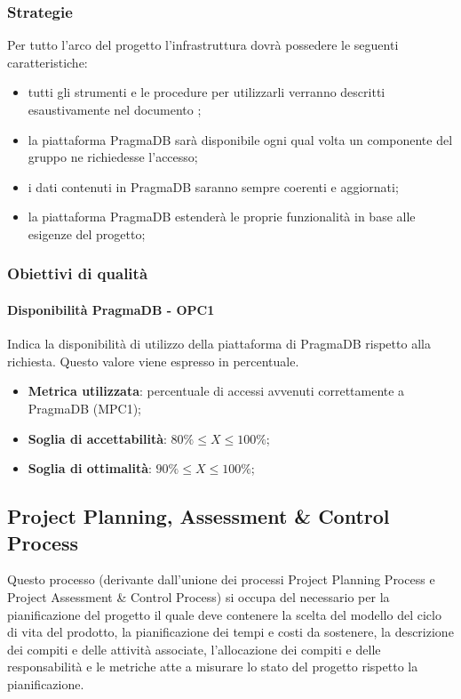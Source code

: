 \documentclass[PdQ.tex]{subfiles}
\begin{document}
		\subsubsection{Strategie}
		Per tutto l'arco del progetto l'infrastruttura dovrà possedere le seguenti caratteristiche:
		\begin{itemize}
			\item tutti gli strumenti e le procedure per utilizzarli verranno descritti esaustivamente nel documento \NPdocRP{};
			\item la piattaforma PragmaDB sarà disponibile ogni qual volta un componente del gruppo ne richiedesse l'accesso;
			\item i dati contenuti in PragmaDB saranno sempre coerenti e aggiornati;
			\item la piattaforma PragmaDB estenderà le proprie funzionalità in base alle esigenze del progetto;
		\end{itemize}
	
		\subsubsection{Obiettivi di qualità}
			\paragraph{Disponibilità PragmaDB - OPC1}
				Indica la disponibilità di utilizzo della piattaforma di PragmaDB rispetto alla richiesta. Questo valore viene espresso in percentuale.
				\begin{itemize}
					\item \textbf{Metrica utilizzata}: percentuale di accessi avvenuti correttamente a PragmaDB (MPC1);
					\item \textbf{Soglia di accettabilità}: \begin{math}80\% \leq X \leq 100\%\end{math};
					\item \textbf{Soglia di ottimalità}: \begin{math}90\% \leq X \leq 100\%\end{math};
				\end{itemize}
		
	\subsection{Project Planning, Assessment \& Control Process}
		Questo processo (derivante dall’unione dei processi Project Planning Process e Project Assessment
		\& Control Process) si occupa del necessario per la pianificazione del progetto il quale deve
		contenere la scelta del modello del ciclo di vita del prodotto, la pianificazione dei tempi e costi da
		sostenere, la descrizione dei compiti e delle attività associate, l'allocazione dei compiti e delle
		responsabilità e le metriche atte a misurare lo stato del progetto rispetto la pianificazione.
		
\end{document}
